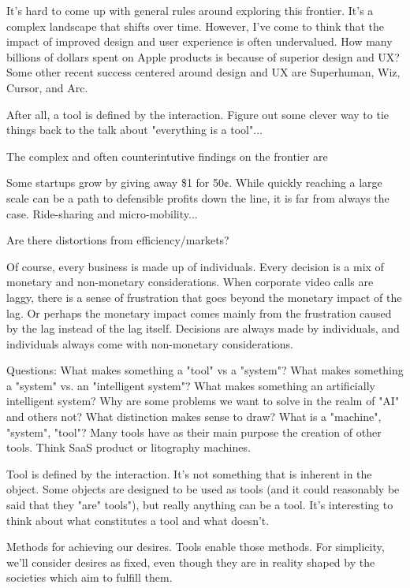 \documentclass[12pt]{article}  %
\begin{document}
It's hard to come up with general rules around exploring this frontier. It's a complex landscape that shifts over time. However, I've come to think that the impact of improved design and user experience is often undervalued. How many billions of dollars spent on Apple products is because of superior design and UX? Some other recent success centered around design and UX are Superhuman, Wiz, Cursor, and Arc.

After all, a tool is defined by the interaction. Figure out some clever way to tie things back to the talk about "everything is a tool"...

The complex and often counterintutive findings on the frontier are 

Some startups grow by giving away \$1 for 50¢. While quickly reaching a large scale can be a path to defensible profits down the line, it is far from always the case. Ride-sharing and micro-mobility...

Are there distortions from efficiency/markets? 
\printbibliography

Of course, every business is made up of individuals. Every decision is a mix of monetary and non-monetary considerations. When corporate video calls are laggy, there is a sense of frustration that goes beyond the monetary impact of the lag. Or perhaps the monetary impact comes mainly from the frustration caused by the lag instead of the lag itself. Decisions are always made by individuals, and individuals always come with non-monetary considerations.

Questions: What makes something a "tool" vs a "system"? What makes something a "system" vs. an "intelligent system"? What makes something an artificially intelligent system? Why are some problems we want to solve in the realm of "AI" and others not? What distinction makes sense to draw? What is a "machine", "system", "tool"? Many tools have as their main purpose the creation of other tools. Think SaaS product or litography machines. 

Tool is defined by the interaction. It's not something that is inherent in the object. Some objects are designed to be used as tools (and it could reasonably be said that they "are" tools"), but really anything can be a tool. It's interesting to think about what constitutes a tool and what doesn't. 

Methods for achieving our desires. Tools enable those methods. For simplicity, we'll consider desires as fixed, even though they are in reality shaped by the societies which aim to fulfill them.
\end{document}
